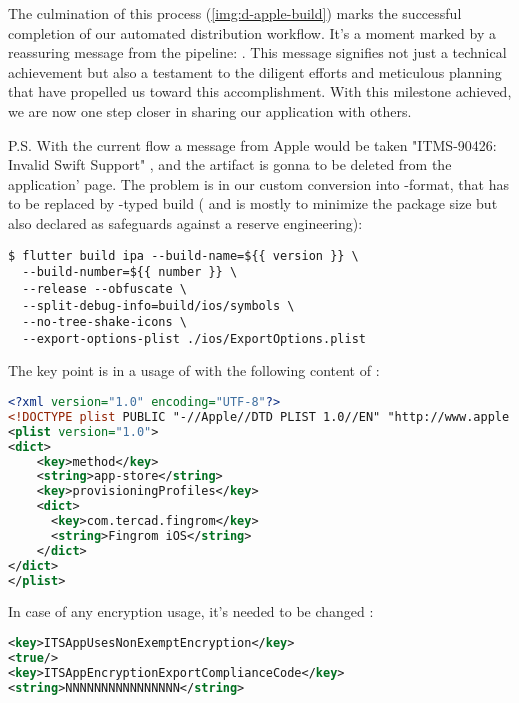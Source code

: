 \noindent The culmination of this process (\cref{img:d-apple-build}) marks the successful completion of our automated 
distribution workflow. It's a moment marked by a reassuring message from the pipeline: . 
This message signifies not just a technical achievement but also a testament to the diligent efforts and meticulous 
planning that have propelled us toward this accomplishment. With this milestone achieved, we are now one step closer 
in sharing our application with others.


\noindent P.S. With the current flow a message from Apple would be taken "ITMS-90426: Invalid Swift Support" ,
and the artifact is gonna to be deleted from the application' page. The problem is in our custom conversion into 
-format, that has to be replaced by -typed build ( and  is mostly to 
minimize the package size but also declared as safeguards against a reserve engineering):

\begin{lstlisting}[language=terminal]
$ flutter build ipa --build-name=${{ version }} \
  --build-number=${{ number }} \
  --release --obfuscate \
  --split-debug-info=build/ios/symbols \
  --no-tree-shake-icons \
  --export-options-plist ./ios/ExportOptions.plist
\end{lstlisting}

\noindent The key point is in a usage of  with the following content of :

\begin{lstlisting}[language=xml]
<?xml version="1.0" encoding="UTF-8"?>
<!DOCTYPE plist PUBLIC "-//Apple//DTD PLIST 1.0//EN" "http://www.apple.com/DTDs/PropertyList-1.0.dtd">
<plist version="1.0">
<dict>
    <key>method</key>
    <string>app-store</string>
    <key>provisioningProfiles</key>
    <dict>
      <key>com.tercad.fingrom</key>
      <string>Fingrom iOS</string>
    </dict>
</dict>
</plist>
\end{lstlisting}

\noindent In case of any encryption usage, it's needed to be changed :

\begin{lstlisting}[language=xml]
<key>ITSAppUsesNonExemptEncryption</key>
<true/>
<key>ITSAppEncryptionExportComplianceCode</key>
<string>NNNNNNNNNNNNNNNN</string>
\end{lstlisting}

